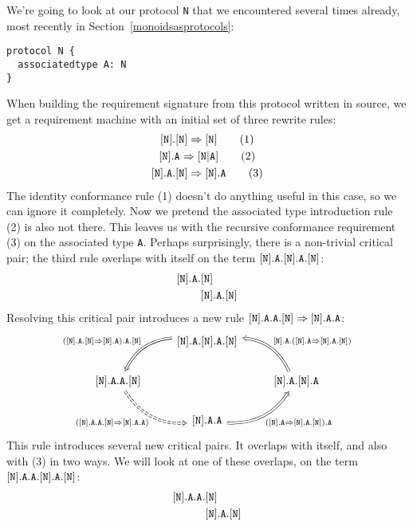 \documentclass[../generics]{subfiles}
\begin{document}
We're going to look at our protocol \texttt{N} that we encountered several times already, most recently in Section~\ref{monoidsasprotocols}:
\begin{Verbatim}
protocol N {
  associatedtype A: N
}
\end{Verbatim}
When building the requirement signature from this protocol written in source, we get a requirement machine with an initial set of three rewrite rules:
\begin{gather*}
\protosym{N}.\protosym{N}\Rightarrow\protosym{N}\tag{1}\\
\protosym{N}.\texttt{A}\Rightarrow\assocsym{N}{A}\tag{2}\\
\protosym{N}.\texttt{A}.\protosym{N}\Rightarrow\protosym{N}.\texttt{A}\tag{3}
\end{gather*}
The identity conformance rule (1) doesn't do anything useful in this case, so we can ignore it completely. Now we pretend the associated type introduction rule (2) is also not there. This leaves us with the recursive conformance requirement (3) on the associated type \texttt{A}. Perhaps surprisingly, there is a non-trivial critical pair; the third rule overlaps with itself on the term $[\texttt{N}].\texttt{A}.[\texttt{N}].\texttt{A}.[\texttt{N}]$:
\begin{align*}
[\texttt{N}].\texttt{A}.&[\texttt{N}]\\
&[\texttt{N}].\texttt{A}.[\texttt{N}]
\end{align*}
Resolving this critical pair introduces a new rule $[\texttt{N}].\texttt{A}.\texttt{A}.[\texttt{N}]\Rightarrow[\texttt{N}].\texttt{A}.\texttt{A}$:
\[
\FourLoopDerived%
{\protosym{N}.\texttt{A}.\protosym{N}.\texttt{A}.\protosym{N}}%
{\protosym{N}.\texttt{A}.\texttt{A}.\protosym{N}}%
{\protosym{N}.\texttt{A}.\texttt{A}}%
{\protosym{N}.\texttt{A}.\protosym{N}.\texttt{A}}%
{(\protosym{N}.\texttt{A}.\protosym{N}\Rightarrow\protosym{N}.\texttt{A}).\texttt{A}.\protosym{N}}%
{(\protosym{N}.\texttt{A}.\texttt{A}.\protosym{N}\Rightarrow\protosym{N}.\texttt{A}.\texttt{A})}%
{(\protosym{N}.\texttt{A}\Rightarrow\protosym{N}.\texttt{A}.\protosym{N}).\texttt{A}}%
{\protosym{N}.\texttt{A}.(\protosym{N}.\texttt{A}\Rightarrow\protosym{N}.\texttt{A}.\protosym{N})}
\]
This rule introduces several new critical pairs. It overlaps with itself, and also with (3) in two ways. We will look at one of these overlaps, on the term $[\texttt{N}].\texttt{A}.\texttt{A}.[\texttt{N}].\texttt{A}.[\texttt{N}]$:
\begin{align*}
[\texttt{N}].\texttt{A}.\texttt{A}.&[\texttt{N}]\\
&[\texttt{N}].\texttt{A}.[\texttt{N}]
\end{align*}
\end{document}

